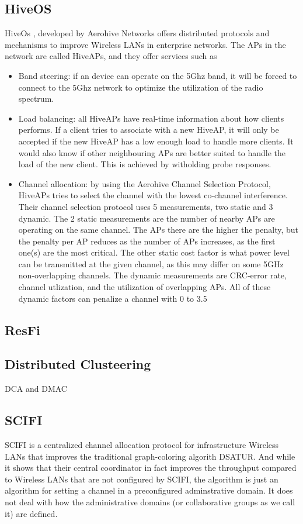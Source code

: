\subsection{HiveOS}
HiveOs \cite{Aerohive}, developed by Aerohive Networks offers distributed protocols and mechanisms to improve Wireless LANs in enterprise networks. The APs 
in the network are called HiveAPs, and they offer services such as
\begin{itemize}
	\item Band steering: if an device can operate on the 5Ghz band, it will be forced to connect to the 5Ghz network to optimize the utilization of the radio spectrum. 
	\item Load balancing: all HiveAPs have real-time information about how clients performs. If a client tries to associate with a new HiveAP, it will only be accepted
				if the new HiveAP has a low enough load to handle more clients. It would also know if other neighbouring APs are better suited to handle the load of the new client.
				This is achieved by witholding probe responses. 
	\item Channel allocation: by using the Aerohive Channel Selection Protocol, HiveAPs tries to select the channel with the lowest co-channel interference. Their channel selection protocol uses 5 measurements, two static and 3 dynamic.
	The 2 static measurements are the number of nearby APs are operating on the same channel. The APs there are the higher the penalty, but the penalty per AP reduces as the number of APs increases, as the first one(s) are the most
	critical. The other static cost factor is what power level can be transmitted at the given channel, as this may differ on some 5GHz non-overlapping channels. The dynamic measurements are CRC-error rate, channel utlization,
	and the utilization of overlapping APs. All of these dynamic factors can penalize a channel with 0 to 3.5%
\end{itemize}



\subsection{ResFi}
\subsection{Distributed Clusteering}
DCA and DMAC

\subsection{SCIFI} SCIFI \cite{SCIFI} is a centralized channel allocation protocol for infrastructure Wireless LANs that improves the traditional graph-coloring algorith DSATUR. 
		And while it shows that their central coordinator in fact improves the throughput compared to Wireless LANs that are not configured by SCIFI, the algorithm is just an algorithm for setting a channel in a preconfigured adminstrative domain. It does not deal with how the administrative domains (or collaborative groups as we call it) are defined. 


